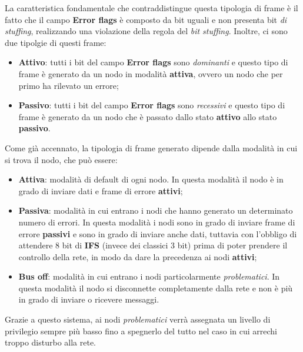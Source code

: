 La caratteristica fondamentale che contraddistingue questa tipologia di frame è il fatto che il campo \textbf{Error flags} è composto da bit uguali e non presenta bit \emph{di stuffing}, realizzando una violazione della regola del \emph{bit stuffing}.
Inoltre, ci sono due tipolgie di questi frame:
\begin{itemize}
    \item \textbf{Attivo}: tutti i bit del campo \textbf{Error flags} sono \emph{dominanti} e questo tipo di frame è generato da un nodo in modalità \textbf{attiva}, ovvero un nodo che per primo ha rilevato un errore;
    \item \textbf{Passivo}: tutti i bit del campo \textbf{Error flags} sono \emph{recessivi} e questo tipo di frame è generato da un nodo che è passato dallo stato \textbf{attivo} allo stato \textbf{passivo}.
\end{itemize}

Come già accennato, la tipologia di frame generato dipende dalla modalità in cui si trova il nodo, che può essere:
\begin{itemize}
    \item \textbf{Attiva}: modalità di default di ogni nodo. In questa modalità il nodo è in grado di inviare dati e frame di errore \textbf{attivi};
    \item \textbf{Passiva}: modalità in cui entrano i nodi che hanno generato un determinato numero di errori. In questa modalità i nodi sono in grado di inviare frame di errore \textbf{passivi} e sono in grado di inviare anche dati, tuttavia con l'obbligo di attendere 8 bit di \textbf{IFS} (invece dei classici 3 bit) prima di poter prendere il controllo della rete, in modo da dare la precedenza ai nodi \textbf{attivi};
    \item \textbf{Bus off}: modalità in cui entrano i nodi particolarmente \emph{problematici}. In questa modalità il nodo si disconnette completamente dalla rete e non è più in grado di inviare o ricevere messaggi.
\end{itemize}
Grazie a questo sistema, ai nodi \emph{problematici} verrà assegnata un livello di privilegio sempre più basso fino a spegnerlo del tutto nel caso in cui arrechi troppo disturbo alla rete.

